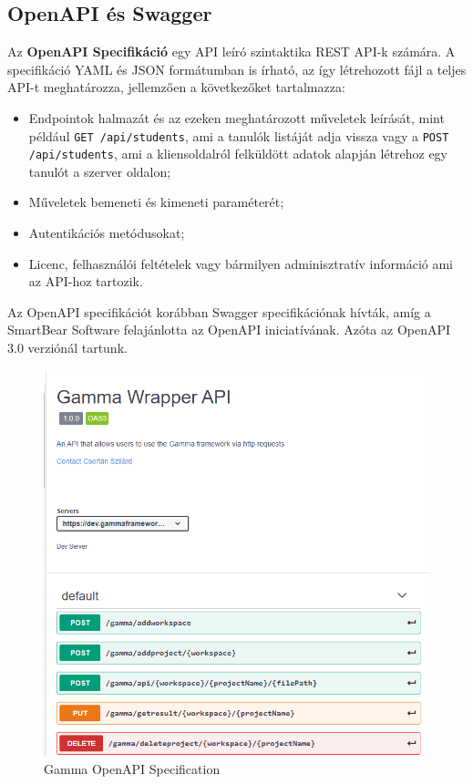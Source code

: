 \subsection{OpenAPI és Swagger}
Az \textbf{OpenAPI Specifikáció} \cite{swagger} egy API leíró szintaktika REST API-k számára. A specifikáció YAML és JSON formátumban is írható, az így létrehozott fájl a teljes API-t meghatározza, jellemzően a következőket tartalmazza:
\begin{itemize}
	\item Endpointok halmazát és az ezeken meghatározott műveletek leírását, mint például \texttt{GET /api/students}, ami a tanulók listáját adja vissza vagy a \texttt{POST /api/students}, ami a kliensoldalról felküldött adatok alapján létrehoz egy tanulót a szerver oldalon;
	\item Műveletek bemeneti és kimeneti paraméterét;
	\item Autentikációs metódusokat;
	\item Licenc, felhasználói feltételek vagy bármilyen adminisztratív információ ami az API-hoz tartozik.
\end{itemize}

Az OpenAPI specifikációt korábban Swagger specifikációnak hívták, amíg a SmartBear Software felajánlotta az OpenAPI iniciatívának. Azóta az OpenAPI 3.0 verziónál tartunk.

\begin{figure}[!ht]
	\includegraphics[width=150mm, keepaspectratio]{figures/swagerr_UI.png}
	\caption{Gamma OpenAPI Specification}
	\label{fig:openAPI_swagger}
\end{figure}

